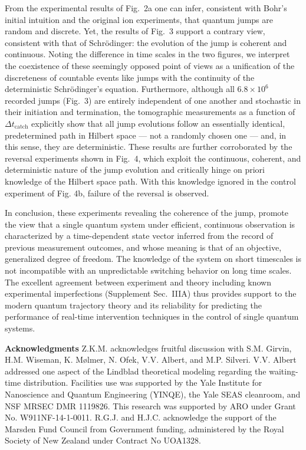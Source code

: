 \documentclass[
	 			preprint,     		superscriptaddress, 																longbibliography,
		amsmath, amssymb,
		aps,  prb,   		floatfix,
		linenumbers     
	]{revtex4-1}
\begin{document}
From the experimental results of Fig.~2a one can infer, consistent with Bohr's initial intuition and the original ion experiments, that quantum jumps are random and discrete. 
Yet, the results of Fig.~3 support a contrary view, consistent with that of Schrödinger: the evolution of the jump is coherent and continuous. 
Noting the difference in time scales in the two figures, we interpret the coexistence of these seemingly opposed point of views as a unification of the discreteness of countable events like jumps  with the continuity of the deterministic Schrödinger’s equation.
Furthermore, although all $6.8\times10^6$ recorded jumps (Fig.~3) are entirely independent of one another and stochastic in their initiation and termination, the tomographic measurements as a function of $\Delta t_\mathrm{catch}$ explicitly show that all jump evolutions follow an essentially identical, predetermined path in Hilbert space — not a randomly chosen one — and, in this sense, they are deterministic.  These results are further corroborated by  the reversal experiments shown in Fig.~4,  which exploit the continuous, coherent, and deterministic nature of the jump evolution and critically hinge on priori knowledge of the Hilbert space path. 
With this knowledge ignored in the control experiment of Fig. 4b,  failure of the reversal is observed. 

In conclusion, these experiments revealing the coherence of the jump, promote the view that a single quantum system under efficient, continuous observation is characterized by a time-dependent state vector inferred from the record of previous measurement outcomes, and whose meaning is that of an objective, generalized degree of freedom.
The knowledge of the system on short timescales is not incompatible with an unpredictable switching behavior on long time scales. 
The excellent agreement between experiment and theory including known experimental imperfections  (Supplement Sec.~IIIA) thus provides support to the modern quantum trajectory theory and its reliability for predicting the performance of real-time intervention techniques in the control of single quantum systems. 



\footnotesize
\textbf{Acknowledgments}\enspace
Z.K.M. acknowledges fruitful discussion with S.M. Girvin, H.M. Wiseman, K. M{\o}lmer, N. Ofek,  V.V. Albert, and M.P. Silveri.  V.V. Albert addressed one aspect of the Lindblad theoretical modeling regarding the waiting-time distribution. 
Facilities use was supported by the  Yale Institute for Nanoscience and Quantum Engineering (YINQE), the Yale SEAS cleanroom, and NSF MRSEC DMR 1119826. This research
was supported by ARO under Grant No. W911NF-14-1-0011.
R.G.J. and H.J.C. acknowledge the support of the Marsden Fund Council from Government funding, administered by the Royal Society of New Zealand under Contract No UOA1328.
\end{document}
